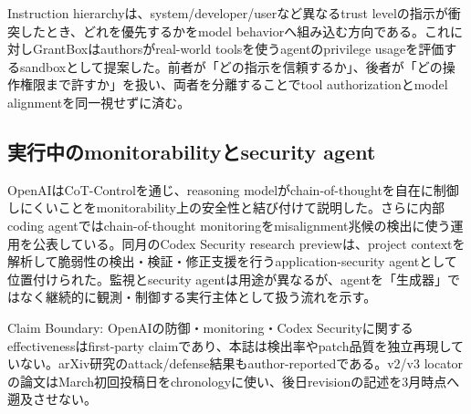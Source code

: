 Instruction hierarchyは、system/developer/userなど異なるtrust levelの指示が衝突したとき、どれを優先するかをmodel behaviorへ組み込む方向である。これに対しGrantBoxはauthorsがreal-world toolsを使うagentのprivilege usageを評価するsandboxとして提案した。前者が「どの指示を信頼するか」、後者が「どの操作権限まで許すか」を扱い、両者を分離することでtool authorizationとmodel alignmentを同一視せずに済む。\autocite{src-18b7ee4fe5e4,src-549bffaad22c}


\subsection{実行中のmonitorabilityとsecurity agent}

OpenAIはCoT-Controlを通じ、reasoning modelがchain-of-thoughtを自在に制御しにくいことをmonitorability上の安全性と結び付けて説明した。さらに内部coding agentではchain-of-thought monitoringをmisalignment兆候の検出に使う運用を公表している。同月のCodex Security research previewは、project contextを解析して脆弱性の検出・検証・修正支援を行うapplication-security agentとして位置付けられた。監視とsecurity agentは用途が異なるが、agentを「生成器」ではなく継続的に観測・制御する実行主体として扱う流れを示す。\autocite{src-287a6bf67154,src-5becf449a527,src-b4b340379768}


\begin{claimboundary}
Claim Boundary: OpenAIの防御・monitoring・Codex Securityに関するeffectivenessはfirst-party claimであり、本誌は検出率やpatch品質を独立再現していない。arXiv研究のattack/defense結果もauthor-reportedである。v2/v3 locatorの論文はMarch初回投稿日をchronologyに使い、後日revisionの記述を3月時点へ遡及させない。\autocite{src-3dec299964e6,src-549bffaad22c,src-5becf449a527,src-87dacccfecfd,src-b4b340379768,src-e627c8192172}
\end{claimboundary}
